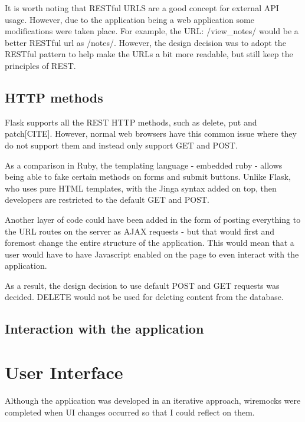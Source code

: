 It is worth noting that RESTful URLS are a good concept for external API usage. However, due to the application being a web application some modifications were taken place. For example, the URL: /view_notes/ would be a better RESTful url as /notes/. However, the design decision was to adopt the RESTful pattern to help make the URLs a bit more readable, but still keep the principles of REST.

\subsection{HTTP methods}
Flask supports all the REST HTTP methods, such as delete, put and patch[CITE]. However, normal web browsers have this common issue where they do not support them and instead only support GET and POST.

As a comparison in Ruby, the templating language - embedded ruby - allows being able to fake certain methods on forms and submit buttons. Unlike Flask, who uses pure HTML templates, with the Jinga syntax added on top, then developers are restricted to the default GET and POST.

Another layer of code could have been added in the form of posting everything to the URL routes on the server as AJAX requests - but that would first and foremost change the entire structure of the application. This would mean that a user would have to have Javascript enabled on the page to even interact with the application.

As a result, the design decision to use default POST and GET requests was decided. DELETE would not be used for deleting content from the database.

\subsection{Interaction with the application}






\section{User Interface}
Although the application was developed in an iterative approach, wiremocks were completed when UI changes occurred so that I could reflect on them.

